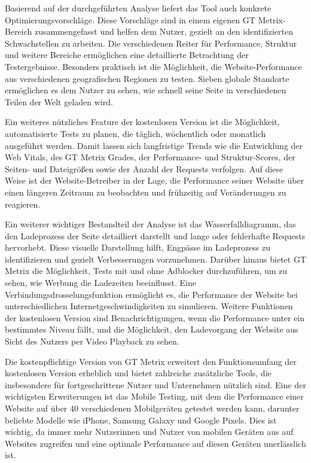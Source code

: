 Basierend auf der durchgeführten Analyse liefert das Tool auch konkrete Optimierungsvorschläge. Diese Vorschläge sind in einem eigenen GT Metrix-Bereich zusammengefasst und helfen dem Nutzer, gezielt an den identifizierten Schwachstellen zu arbeiten. Die verschiedenen Reiter für Performance, Struktur und weitere Bereiche ermöglichen eine detaillierte Betrachtung der Testergebnisse. Besonders praktisch ist die Möglichkeit, die Website-Performance aus verschiedenen geografischen Regionen zu testen. Sieben globale Standorte ermöglichen es dem Nutzer zu sehen, wie schnell seine Seite in verschiedenen Teilen der Welt geladen wird.

Ein weiteres nützliches Feature der kostenlosen Version ist die Möglichkeit, automatisierte Tests zu planen, die täglich, wöchentlich oder monatlich ausgeführt werden. Damit lassen sich langfristige Trends wie die Entwicklung der Web Vitals, des GT Metrix Grades, der Performance- und Struktur-Scores, der Seiten- und Dateigrößen sowie der Anzahl der Requests verfolgen. Auf diese Weise ist der Website-Betreiber in der Lage, die Performance seiner Website über einen längeren Zeitraum zu beobachten und frühzeitig auf Veränderungen zu reagieren.

Ein weiterer wichtiger Bestandteil der Analyse ist das Wasserfalldiagramm, das den Ladeprozess der Seite detailliert darstellt und lange oder fehlerhafte Requests hervorhebt. Diese visuelle Darstellung hilft, Engpässe im Ladeprozess zu identifizieren und gezielt Verbesserungen vorzunehmen. Darüber hinaus bietet GT Metrix die Möglichkeit, Tests mit und ohne Adblocker durchzuführen, um zu sehen, wie Werbung die Ladezeiten beeinflusst. Eine Verbindungsdrosselungsfunktion ermöglicht es, die Performance der Website bei unterschiedlichen Internetgeschwindigkeiten zu simulieren. Weitere Funktionen der kostenlosen Version sind Benachrichtigungen, wenn die Performance unter ein bestimmtes Niveau fällt, und die Möglichkeit, den Ladevorgang der Website aus Sicht des Nutzers per Video Playback zu sehen.

Die kostenpflichtige Version von GT Metrix erweitert den Funktionsumfang der kostenlosen Version erheblich und bietet zahlreiche zusätzliche Tools, die insbesondere für fortgeschrittene Nutzer und Unternehmen nützlich sind. Eine der wichtigsten Erweiterungen ist das Mobile Testing, mit dem die Performance einer Website auf über 40 verschiedenen Mobilgeräten getestet werden kann, darunter beliebte Modelle wie iPhone, Samsung Galaxy und Google Pixels. Dies ist wichtig, da immer mehr Nutzerinnen und Nutzer von mobilen Geräten aus auf Websites zugreifen und eine optimale Performance auf diesen Geräten unerlässlich ist.

